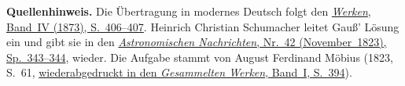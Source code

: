 \par\medskip\begin{small}\noindent\textbf{Quellenhinweis.} Die Übertragung in modernes Deutsch folgt den \href{https://gdz.sub.uni-goettingen.de/id/PPN236005081}{\textit{Werken}, Band~IV (1873), S.~406--407}. Heinrich Christian Schumacher leitet Gauß’ Lösung ein und gibt sie in den \href{https://www.digitale-sammlungen.de/de/view/bsb10049427?page=204}{\textit{Astronomischen Nachrichten}, Nr.~42 (November~1823), Sp.~343--344}, wieder. Die Aufgabe stammt von August Ferdinand Möbius (1823, S.~61, \href{https://www.e-rara.ch/download/pdf/5633522.pdf}{wiederabgedruckt in den \textit{Gesammelten Werken}, Band~I, S.~394}).\par\end{small}

